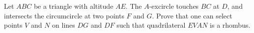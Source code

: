 Let $ABC$ be a triangle with altitude $AE$. The $A$-excircle touches $BC$ at $D$, and intersects the circumcircle at two points $F$ and $G$. Prove that one can select points $V$ and $N$ on lines $DG$ and $DF$ such that quadrilateral $EVAN$ is a rhombus.
